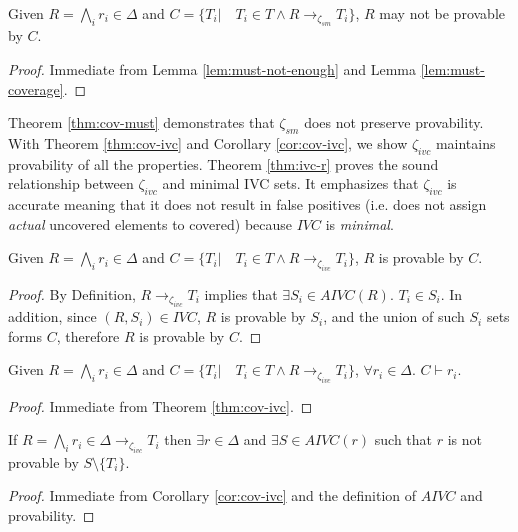 \begin{theorem}
\label{thm:cov-must}
Given $R = \bigwedge_{i} {r_i \in \Delta}$ and 
$C = \{T_i |\quad T_i \in T \wedge R \rightarrow_{\zeta_{sm}}T_i \}$, 
$R$ may not be provable by $C$.
\end{theorem}
\begin{proof}
Immediate from Lemma \ref{lem:must-not-enough} and Lemma \ref{lem:must-coverage}.
\end{proof}
\vspace{2mm}
Theorem \ref{thm:cov-must} demonstrates that $\zeta_{sm}$ does not preserve provability.
With Theorem \ref{thm:cov-ivc} and Corollary \ref{cor:cov-ivc},
we show $\zeta_{ivc}$ maintains provability of all the properties.
Theorem \ref{thm:ivc-r} proves the sound relationship
between $\zeta_{ivc}$ and minimal IVC sets.
It emphasizes that $\zeta_{ivc}$ is accurate meaning that it does not result in false positives
(i.e. does not assign \emph{actual} uncovered elements to covered) because $IVC$ is \emph{minimal}.

\begin{theorem}
\label{thm:cov-ivc}
Given $R = \bigwedge_{i} {r_i \in \Delta}$ and
$C = \{T_i |\quad T_i \in T \wedge R \rightarrow_{\zeta_{ivc}} T_i \}$,
$R$ is provable by $C$.
\end{theorem}
\begin{proof}
By Definition, $R \rightarrow_{\zeta_{ivc}} T_i$ implies that $\exists S_i \in AIVC(R)$. $T_i \in S_i$.
In addition, since $(R, S_i) \in IVC$, $R$ is provable by $S_i$, and the union of such $S_i$ sets
forms $C$,
therefore $R$ is provable by $C$.
\end{proof}
\vspace{2mm}

\begin{coroll}
\label{cor:cov-ivc}
Given $R = \bigwedge_{i} {r_i \in \Delta}$ and 
$C = \{T_i |\quad T_i \in T \wedge  R  \rightarrow_{\zeta_{ivc}} T_i \}$,
$\forall r_i \in \Delta$. $C \vdash r_i$.
\end{coroll}
\begin{proof}
Immediate from Theorem \ref{thm:cov-ivc}.
\end{proof}
\vspace{2mm}

\begin{theorem}
\label{thm:ivc-r}
If $R = \bigwedge_{i} {r_i \in \Delta}  \rightarrow_{\zeta_{ivc}} T_i$ then $\exists r \in \Delta$ and $\exists S \in AIVC(r)$ such that $r$ is not provable by $S \setminus \{T_i \}$.
\end{theorem}
\begin{proof}
Immediate from Corollary \ref{cor:cov-ivc} and the definition of $AIVC$ and provability.
\end{proof}
\vspace{2mm}


